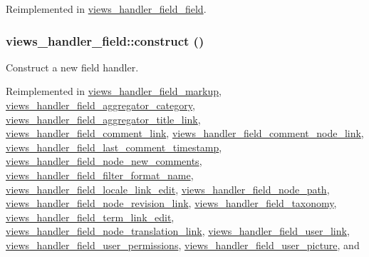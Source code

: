 Reimplemented in \hyperlink{classviews__handler__field__field_a02da80b019b7cfeb7d00571b7b2b8b6d}{views\_\-handler\_\-field\_\-field}.\hypertarget{classviews__handler__field_a3d50050864c255b71c842972a45d39f6}{
\subsubsection[{construct}]{\setlength{\rightskip}{0pt plus 5cm}views\_\-handler\_\-field::construct ()}}
\label{classviews__handler__field_a3d50050864c255b71c842972a45d39f6}
Construct a new field handler. 

Reimplemented in \hyperlink{classviews__handler__field__markup_addc5d6e6130133c1d65d8b96dce502a5}{views\_\-handler\_\-field\_\-markup}, \hyperlink{classviews__handler__field__aggregator__category_ad85fc06aa0e07281e3989dee8bd0c975}{views\_\-handler\_\-field\_\-aggregator\_\-category}, \hyperlink{classviews__handler__field__aggregator__title__link_abcde91e341b70cc842fec304c7de8376}{views\_\-handler\_\-field\_\-aggregator\_\-title\_\-link}, \hyperlink{classviews__handler__field__comment__link_a11c7fcae5ff5f91fa48fc1581115869b}{views\_\-handler\_\-field\_\-comment\_\-link}, \hyperlink{classviews__handler__field__comment__node__link_a6a8823310c2ef5c3a70e6a394e45e699}{views\_\-handler\_\-field\_\-comment\_\-node\_\-link}, \hyperlink{classviews__handler__field__last__comment__timestamp_aa42644549a55057d5f8c466690ec2692}{views\_\-handler\_\-field\_\-last\_\-comment\_\-timestamp}, \hyperlink{classviews__handler__field__node__new__comments_aa496a5184a390c29a60e0dc7d16c23e5}{views\_\-handler\_\-field\_\-node\_\-new\_\-comments}, \hyperlink{classviews__handler__field__filter__format__name_aeacc272fd36677b2d56063a578e23d3a}{views\_\-handler\_\-field\_\-filter\_\-format\_\-name}, \hyperlink{classviews__handler__field__locale__link__edit_a6f7db94c0dc07564c1853fd7ef153a6e}{views\_\-handler\_\-field\_\-locale\_\-link\_\-edit}, \hyperlink{classviews__handler__field__node__path_a9f8110039f0e7f6bb87792c222c7fd06}{views\_\-handler\_\-field\_\-node\_\-path}, \hyperlink{classviews__handler__field__node__revision__link_abebde82066efb55992015fcd460027ff}{views\_\-handler\_\-field\_\-node\_\-revision\_\-link}, \hyperlink{classviews__handler__field__taxonomy_a7020806fbe7b4b7c182c422dd327b0fc}{views\_\-handler\_\-field\_\-taxonomy}, \hyperlink{classviews__handler__field__term__link__edit_aaad58c0af52bdc78aa28b6571340bb07}{views\_\-handler\_\-field\_\-term\_\-link\_\-edit}, \hyperlink{classviews__handler__field__node__translation__link_a834c20607c0a929900b7ace53425847a}{views\_\-handler\_\-field\_\-node\_\-translation\_\-link}, \hyperlink{classviews__handler__field__user__link_a3c0e66ff0504b344066db923819456f7}{views\_\-handler\_\-field\_\-user\_\-link}, \hyperlink{classviews__handler__field__user__permissions_aac3a7f41e457a5d5e858deb4c955c1af}{views\_\-handler\_\-field\_\-user\_\-permissions}, \hyperlink{classviews__handler__field__user__picture_a65f7bf025afe7e60df88cfe9a72eaf4a}{views\_\-handler\_\-field\_\-user\_\-picture}, and 
